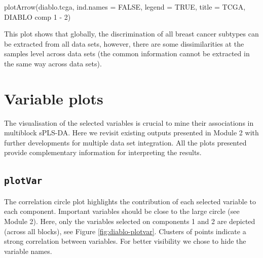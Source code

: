 \documentclass[
]{book}
\newenvironment{Shaded}{\begin{snugshade}}{\end{snugshade}}
\newcommand{\AttributeTok}[1]{\textcolor[rgb]{0.77,0.63,0.00}{#1}}
\newcommand{\ConstantTok}[1]{\textcolor[rgb]{0.00,0.00,0.00}{#1}}
\newcommand{\FunctionTok}[1]{\textcolor[rgb]{0.00,0.00,0.00}{#1}}
\newcommand{\NormalTok}[1]{#1}
\newcommand{\StringTok}[1]{\textcolor[rgb]{0.31,0.60,0.02}{#1}}
\begin{document}
\begin{Shaded}
\begin{Highlighting}[]
\FunctionTok{plotArrow}\NormalTok{(diablo.tcga, }\AttributeTok{ind.names =} \ConstantTok{FALSE}\NormalTok{, }\AttributeTok{legend =} \ConstantTok{TRUE}\NormalTok{, }
          \AttributeTok{title =} \StringTok{\textquotesingle{}TCGA, DIABLO comp 1 {-} 2\textquotesingle{}}\NormalTok{)}
\end{Highlighting}
\end{Shaded}



This plot shows that globally, the discrimination of all breast cancer subtypes can be extracted from all data sets, however, there are some dissimilarities at the samples level across data sets (the common information cannot be extracted in the same way across data sets).

\hypertarget{diablo:result:varplot}{%
\section{Variable plots}\label{diablo:result:varplot}}

The visualisation of the selected variables is crucial to mine their associations in multiblock sPLS-DA. Here we revisit existing outputs presented in Module 2 with further developments for multiple data set integration. All the plots presented provide complementary information for interpreting the results.

\hypertarget{plotvar}{%
\subsection{\texorpdfstring{\texttt{plotVar}}{plotVar}}\label{plotvar}}

The correlation circle plot highlights the contribution of each selected variable to each component. Important variables should be close to the large circle (see Module 2). Here, only the variables selected on components 1 and 2 are depicted (across all blocks), see Figure \ref{fig:diablo-plotvar}. Clusters of points indicate a strong correlation between variables. For better visibility we chose to hide the variable names.
\end{document}
